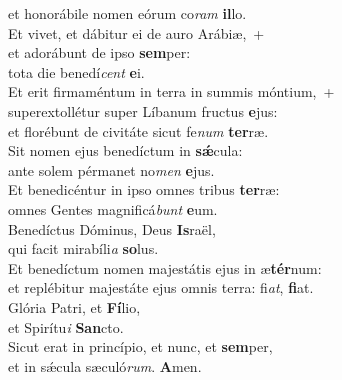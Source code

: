 \evenverse et honorábile nomen eórum co\textit{ram} \textbf{il}lo.\\
\oddverse Et vivet, et dábitur ei de auro Arábiæ,~+\\
\oddverse  et adorábunt de ipso \textbf{sem}per:~\*\\
\oddverse tota die benedí\textit{cent} \textbf{e}i.\\
\evenverse Et erit firmaméntum in terra in summis móntium,~+\\
\evenverse  superextollétur super Líbanum fructus \textbf{e}jus:~\*\\
\evenverse et florébunt de civitáte sicut fe\textit{num} \textbf{ter}ræ.\\
\oddverse Sit nomen ejus benedíctum in \textbf{sǽ}cula:~\*\\
\oddverse ante solem pérmanet no\textit{men} \textbf{e}jus.\\
\evenverse Et benedicéntur in ipso omnes tribus \textbf{ter}ræ:~\*\\
\evenverse omnes Gentes magnificá\textit{bunt} \textbf{e}um.\\
\oddverse Benedíctus Dóminus, Deus \textbf{Is}raël,~\*\\
\oddverse qui facit mirabíli\textit{a} \textbf{so}lus.\\
\evenverse Et benedíctum nomen majestátis ejus in æ\textbf{tér}num:~\*\\
\evenverse et replébitur majestáte ejus omnis terra: fi\textit{at}, \textbf{fi}at.\\
\oddverse Glória Patri, et \textbf{Fí}lio,~\*\\
\oddverse et Spirítu\textit{i} \textbf{San}cto.\\
\evenverse Sicut erat in princípio, et nunc, et \textbf{sem}per,~\*\\
\evenverse et in sǽcula sæculó\textit{rum}. \textbf{A}men.\\
